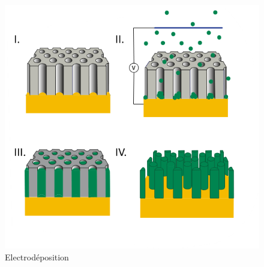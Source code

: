 \begin{figure}[H]
    \centering
    \includegraphics[scale = 0.5]{images/Electrodeposition.png}
    \caption{Electrodéposition \cite{ruiz-gomez_electrodeposition_2022}}
    \label{fig:electrodeposition}
\end{figure}

